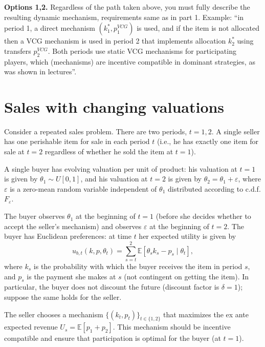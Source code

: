 \documentclass[a4paper]{article}
\begin{document}
\begin{enumerate}
		\textbf{Options 1,2.} Regardless of the path taken above, you must fully describe the resulting dynamic mechanism, requirements same as in part 1. Example: ``in period 1, a direct mechanism $(k^*_1,p^{VCG}_1)$ is used, and if the item is not allocated then a VCG mechanism is used in period 2 that implements allocation $k^*_2$ using transfers $p^{VCG}_{2}$. Both periods use static VCG mechanisms for participating players, which (mechanisms) are incentive compatible in dominant strategies, as was shown in lectures''.
	\end{enumerate}
\fi



\section{Sales with changing valuations}
	Consider a repeated sales problem. There are two periods, $t=1,2$. A single seller has one perishable item for sale in each period $t$ (i.e., he has exactly one item for sale at $t=2$ regardless of whether he sold the item at $t=1$). 
	
	A single buyer has evolving valuation per unit of product: his valuation at $t=1$ is given by $\theta_1 \sim U[0,1]$, and his valuation at $t=2$ is given by $\theta_2 = \theta_1 + \varepsilon$, where $\varepsilon$ is a zero-mean random variable independent of $\theta_1$ distributed according to c.d.f. $F_\varepsilon$.
	
	The buyer observes $\theta_1$ at the beginning of $t=1$ (before she decides whether to accept the seller's mechanism) and observes $\varepsilon$ at the beginning of $t=2$. The buyer has Euclidean preferences: at time $t$ her expected utility is given by
	\begin{equation*}
		u_{b,t} (k,p,\theta_t) = \sum_{s=t}^2 \mathbb{E} \left[ \theta_s k_s - p_s \mid \theta_t \right],
	\end{equation*}
	where $k_s$ is the probability with which the buyer receives the item in period $s$, and $p_s$ is the payment she makes at $s$ (not contingent on getting the item). In particular, the buyer does not discount the future (discount factor is $\delta=1$); suppose the same holds for the seller.
	
	The seller chooses a mechanism $\{(k_t,p_t)\}_{t \in \{1,2\}}$ that maximizes the ex ante expected revenue $U_s = \mathbb{E} \left[ p_1 + p_2 \right]$. This mechanism should be incentive compatible and ensure that participation is optimal for the buyer (at $t=1$).
	
\end{document}
